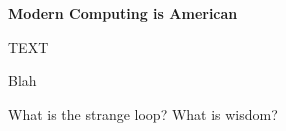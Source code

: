 \begin{tcolorbox}[breakable, enhanced, colback=textbook-blue, sharp corners]
	\vspace{3mm}
	\begin{center}
		\textbf{Modern Computing is American}
	\end{center}
	TEXT
	\vspace{3mm}
\end{tcolorbox}
\vspace{2\baselineskip}

Blah \\


\parbreak

What is the strange loop? What is wisdom?



